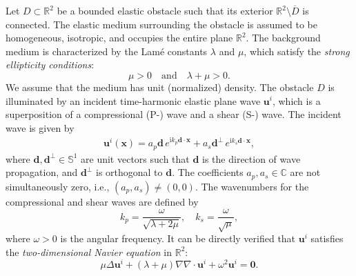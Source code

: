 \documentclass[11pt,reqno,twoside]{amsart}
\theoremstyle{definition}
\theoremstyle{remark}
\numberwithin{equation}{section}
\newcommand{\bmf}[1]{{\mathbf{#1}}}
\begin{document}
	\fi
	
	
	
	Let \( D \subset \mathbb{R}^2 \) be a bounded elastic obstacle such that its exterior \( \mathbb{R}^2 \setminus \overline{D} \) is connected. The elastic medium surrounding the obstacle is assumed to be homogeneous, isotropic, and occupies the entire plane \( \mathbb{R}^2 \). The background medium is characterized by the Lamé constants \( \lambda \) and \( \mu \), which satisfy the \emph{strong ellipticity conditions}:
\[
\mu > 0 \quad \text{and} \quad \lambda + \mu > 0.
\]
We assume that the medium has unit (normalized) density. The obstacle \( D \) is illuminated by an incident time-harmonic elastic plane wave \( \bmf{u}^i \), which is a superposition of a compressional (P-) wave and a shear (S-) wave. The incident wave is given by
\begin{align}\label{eq:ui}
	\bmf{u}^i(\mathbf{x}) = a_p \mathbf{d} \, e^{\mathrm{i} k_p \mathbf{d} \cdot \mathbf{x}} + a_s \mathbf{d}^\perp \, e^{\mathrm{i} k_s \mathbf{d} \cdot \mathbf{x}},
\end{align}
where \( \mathbf{d}, \mathbf{d}^\perp \in \mathbb{S}^1 \) are unit vectors such that \( \mathbf{d} \) is the direction of wave propagation, and \( \mathbf{d}^\perp \) is orthogonal to \( \mathbf{d} \). The coefficients \( a_p, a_s \in \mathbb{C} \) are not simultaneously zero, i.e., \( (a_p, a_s) \neq (0, 0) \). The wavenumbers for the compressional and shear waves are defined by
\[
k_p = \frac{\omega}{\sqrt{\lambda + 2\mu}}, \quad k_s = \frac{\omega}{\sqrt{\mu}},
\]
where \( \omega > 0 \) is the angular frequency. It can be directly verified that \( \bmf{u}^i \) satisfies the \emph{two-dimensional Navier equation} in \( \mathbb{R}^2 \):
\begin{equation}
	\mu \Delta \bmf{u}^i + (\lambda + \mu) \nabla \nabla \cdot \bmf{u}^i + \omega^2 \bmf{u}^i = \bmf{0}.
\end{equation}
\end{document}
